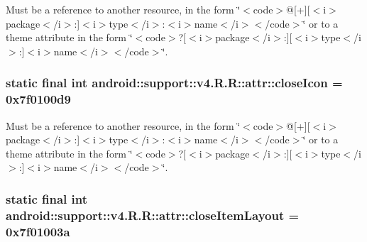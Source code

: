 Must be a reference to another resource, in the form \char`\"{}$<$code$>$@\mbox{[}+\mbox{]}\mbox{[}$<$i$>$package$<$/i$>$:\mbox{]}$<$i$>$type$<$/i$>$:$<$i$>$name$<$/i$>$$<$/code$>$\char`\"{} or to a theme attribute in the form \char`\"{}$<$code$>$?\mbox{[}$<$i$>$package$<$/i$>$:\mbox{]}\mbox{[}$<$i$>$type$<$/i$>$:\mbox{]}$<$i$>$name$<$/i$>$$<$/code$>$\char`\"{}. \hypertarget{classandroid_1_1support_1_1v4_1_1_r_1_1attr_476adbeb90fbab818e9dbd94c01ef292}{
\subsubsection[{closeIcon}]{\setlength{\rightskip}{0pt plus 5cm}static final int android::support::v4.R.R::attr::closeIcon = 0x7f0100d9}}
\label{classandroid_1_1support_1_1v4_1_1_r_1_1attr_476adbeb90fbab818e9dbd94c01ef292}


Must be a reference to another resource, in the form \char`\"{}$<$code$>$@\mbox{[}+\mbox{]}\mbox{[}$<$i$>$package$<$/i$>$:\mbox{]}$<$i$>$type$<$/i$>$:$<$i$>$name$<$/i$>$$<$/code$>$\char`\"{} or to a theme attribute in the form \char`\"{}$<$code$>$?\mbox{[}$<$i$>$package$<$/i$>$:\mbox{]}\mbox{[}$<$i$>$type$<$/i$>$:\mbox{]}$<$i$>$name$<$/i$>$$<$/code$>$\char`\"{}. \hypertarget{classandroid_1_1support_1_1v4_1_1_r_1_1attr_5072858eac0994000618279226f3bfcc}{
\subsubsection[{closeItemLayout}]{\setlength{\rightskip}{0pt plus 5cm}static final int android::support::v4.R.R::attr::closeItemLayout = 0x7f01003a}}
\label{classandroid_1_1support_1_1v4_1_1_r_1_1attr_5072858eac0994000618279226f3bfcc}


